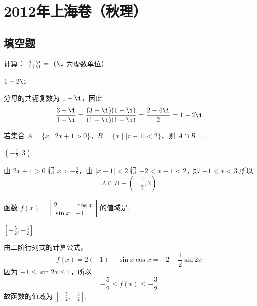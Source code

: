 \chapter{2012年上海卷（秋理）}

\section{填空题}

\begin{problem}
计算： \( \frac{3-\i}{1+\i}= \)\fillinblank{}（\(\i\) 为虚数单位）.
\end{problem}

\begin{answer}
\(1-2\i\)
\end{answer}

\begin{solution}
分母的共轭复数为 \(1-\i\)，因此
\[
\frac{3-\i}{1+\i}
=\frac{(3-\i)(1-\i)}{(1+\i)(1-\i)}
=\frac{2-4\i}{2}
=1-2\i
\]
\end{solution}

\begin{problem}
若集合 \(A = \{x \mid 2x + 1 > 0\}\)，\(B = \{x \mid |x - 1| < 2\}\)，则 \(A \cap B = \)\fillinblank{}.
\end{problem}

\begin{answer}
\(\left(-\frac{1}{2},3\right)\)
\end{answer}

\begin{solution}
由 \(2x+1>0\) 得 \(x>-\frac{1}{2}\)，由 \(|x-1|<2\) 得 \(-2<x-1<2\)，即 \(-1<x<3\).所以
\[
A\cap B=\left(-\frac{1}{2},3\right)
\]
\end{solution}

\begin{problem}
函数 \( f(x) = \left| \begin{matrix} 2 & \cos x \\ \sin x & -1 \end{matrix} \right| \) 的值域是\fillinblank{}.
\end{problem}

\begin{answer}
\(\left[-\frac{5}{2},-\frac{3}{2}\right]\)
\end{answer}

\begin{solution}
由二阶行列式的计算公式，
\[
f(x)=2(-1)-\sin x\cos x=-2-\frac{1}{2}\sin 2x
\]
因为 \(-1\leqslant\sin 2x\leqslant 1\)，所以
\[
-\frac{5}{2}\leqslant f(x)\leqslant-\frac{3}{2}
\]
故函数的值域为 \(\left[-\frac{5}{2},-\frac{3}{2}\right]\).
\end{solution}

